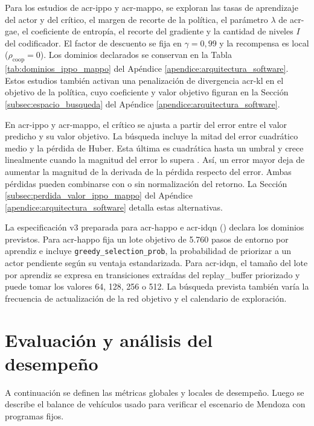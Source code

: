 Para los estudios de \acrshort{acr-ippo} y \acrshort{acr-mappo}, se exploran las tasas de aprendizaje del actor y del crítico, el margen de recorte de la política, el parámetro $\lambda$ de \acrshort{acr-gae}, el coeficiente de entropía, el recorte del gradiente y la cantidad de niveles $I$ del codificador. El factor de descuento se fija en $\gamma = 0{,}99$ y la recompensa es local ($\rho_{\mathrm{coop}}=0$). Los dominios declarados se conservan en la Tabla \ref{tab:dominios_ippo_mappo} del Apéndice \ref{apendice:arquitectura_software}. Estos estudios también activan una penalización de divergencia \acrshort{acr-kl} en el objetivo de la política, cuyo coeficiente y valor objetivo figuran en la Sección \ref{subsec:espacio_busqueda} del Apéndice \ref{apendice:arquitectura_software}.

En \acrshort{acr-ippo} y \acrshort{acr-mappo}, el crítico se ajusta a partir del error entre el valor predicho y su valor objetivo. La búsqueda incluye la mitad del error cuadrático medio y la pérdida de Huber. Esta última es cuadrática hasta un umbral y crece linealmente cuando la magnitud del error lo supera \cite{huber1964robust}. Así, un error mayor deja de aumentar la magnitud de la derivada de la pérdida respecto del error. Ambas pérdidas pueden combinarse con o sin normalización del retorno. La Sección \ref{subsec:perdida_valor_ippo_mappo} del Apéndice \ref{apendice:arquitectura_software} detalla estas alternativas.

La especificación v3 preparada para \acrshort{acr-happo} e \acrshort{acr-idqn} () declara los dominios previstos. Para \acrshort{acr-happo} fija un lote objetivo de 5.760 pasos de entorno por aprendiz e incluye \texttt{greedy\_selection\_prob}, la probabilidad de priorizar a un actor pendiente según su ventaja estandarizada. Para \acrshort{acr-idqn}, el tamaño del lote por aprendiz se expresa en transiciones extraídas del \gls{replay_buffer} priorizado y puede tomar los valores 64, 128, 256 o 512. La búsqueda prevista también varía la frecuencia de actualización de la red objetivo y el calendario de exploración.

\section{Evaluación y análisis del desempeño}
\label{sec:evaluacion_modelos}

A continuación se definen las métricas globales y locales de desempeño. Luego se describe el balance de vehículos usado para verificar el escenario de Mendoza con programas fijos.

